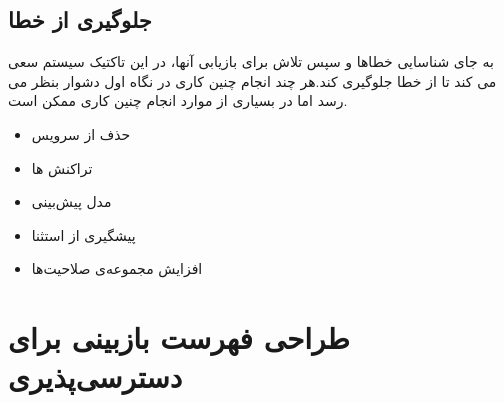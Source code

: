 \subsection{جلوگیری از خطا}
به جای شناسایی خطاها و سپس تلاش برای بازیابی آنها، در این تاکتیک سیستم سعی می کند تا از خطا جلوگیری کند.هر چند انجام چنین کاری در نگاه اول دشوار بنظر می رسد اما در بسیاری از موارد انجام چنین کاری ممکن است.
\begin{itemize}
\item 
حذف از سرویس 
\item
تراکنش ها 
\item
مدل پیش‌بینی 
\item
پیشگیری از استثنا 
\item
افزایش مجموعه‌ی صلاحیت‌ها 
\end{itemize}

\section{طراحی فهرست بازبینی برای دسترسی‌پذیری}
